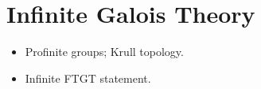 \section{Infinite Galois Theory}
\begin{itemize}
  \item Profinite groups; Krull topology.
  \item Infinite FTGT statement.
\end{itemize}
